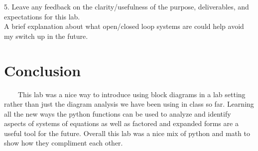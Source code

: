 \documentclass[11pt,a4]{article}
\begin{document}
5. Leave any feedback on the clarity/usefulness of the purpose, deliverables, and expectations for this lab.\\

A brief explanation about what open/closed loop systems are could help avoid my switch up in the future.

\section{Conclusion}
\ \ \ \ This lab was a nice way to introduce using block diagrams in a lab setting rather than just the diagram analysis we have been using in class so far. Learning all the new ways the python functions can be used to analyze and identify aspects of systems of equations as well as factored and expanded forms are a useful tool for the future. Overall this lab was a nice mix of python and math to show how they compliment each other.
\end{document}
